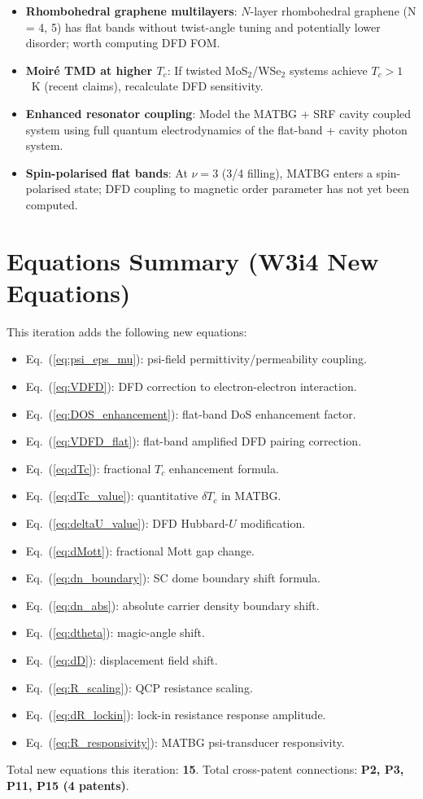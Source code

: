 \documentclass[11pt]{article}
\newcommand{\nuFill}{\nu}
\begin{document}
\begin{itemize}
  \item \textbf{Rhombohedral graphene multilayers}: $N$-layer rhombohedral
    graphene (N = 4, 5) has flat bands without twist-angle tuning and
    potentially lower disorder; worth computing DFD FOM.
  \item \textbf{Moiré TMD at higher $T_c$}: If twisted MoS$_2$/WSe$_2$
    systems achieve $T_c > 1$~K (recent claims), recalculate DFD sensitivity.
  \item \textbf{Enhanced resonator coupling}: Model the MATBG + SRF
    cavity coupled system using full quantum electrodynamics of the
    flat-band + cavity photon system.
  \item \textbf{Spin-polarised flat bands}: At $\nuFill = 3$ (3/4 filling),
    MATBG enters a spin-polarised state; DFD coupling to magnetic order
    parameter has not yet been computed.
\end{itemize}

\section*{Equations Summary (W3i4 New Equations)}

\noindent This iteration adds the following new equations:
\begin{itemize}
  \item Eq.~(\ref{eq:psi_eps_mu}): psi-field permittivity/permeability coupling.
  \item Eq.~(\ref{eq:VDFD}): DFD correction to electron-electron interaction.
  \item Eq.~(\ref{eq:DOS_enhancement}): flat-band DoS enhancement factor.
  \item Eq.~(\ref{eq:VDFD_flat}): flat-band amplified DFD pairing correction.
  \item Eq.~(\ref{eq:dTc}): fractional $T_c$ enhancement formula.
  \item Eq.~(\ref{eq:dTc_value}): quantitative $\delta T_c$ in MATBG.
  \item Eq.~(\ref{eq:deltaU_value}): DFD Hubbard-$U$ modification.
  \item Eq.~(\ref{eq:dMott}): fractional Mott gap change.
  \item Eq.~(\ref{eq:dn_boundary}): SC dome boundary shift formula.
  \item Eq.~(\ref{eq:dn_abs}): absolute carrier density boundary shift.
  \item Eq.~(\ref{eq:dtheta}): magic-angle shift.
  \item Eq.~(\ref{eq:dD}): displacement field shift.
  \item Eq.~(\ref{eq:R_scaling}): QCP resistance scaling.
  \item Eq.~(\ref{eq:dR_lockin}): lock-in resistance response amplitude.
  \item Eq.~(\ref{eq:R_responsivity}): MATBG psi-transducer responsivity.
\end{itemize}

Total new equations this iteration: \textbf{15}.
Total cross-patent connections: \textbf{P2, P3, P11, P15 (4 patents)}.
\end{document}
